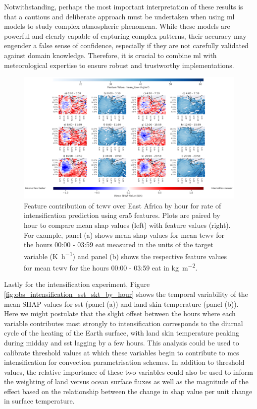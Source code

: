 Notwithstanding, perhaps the most important interpretation of these results is that a cautious and deliberate approach must be undertaken when using \acrshort{ml} models to study complex atmospheric phenomena. While these models are powerful and clearly capable of capturing complex patterns, their accuracy may engender a false sense of confidence, especially if they are not carefully validated against domain knowledge. Therefore, it is crucial to combine \acrshort{ml} with meteorological expertise to ensure robust and trustworthy implementations.

\begin{figure}[ht]
    \centering
    \includegraphics[width=\textwidth]{../figures/generated/experiments/obs_intensification/geographic_corr/obs_intensification_era5_shap_mean_tcwv_map_by_hour.png}
    \caption{Feature contribution of \acrshort{tcwv} over East Africa by hour for rate of intensification prediction using \acrshort{era5} features. Plots are paired by hour to compare mean \acrshort{shap} values (left) with feature values (right). For example, panel (a) shows mean \acrshort{shap} values for mean \acrshort{tcwv} for the hours 00:00 - 03:59 \acrshort{eat} measured in the units of the target variable (\unit{\kelvin\per\hour}) and panel (b) shows the respective feature values for mean \acrshort{tcwv} for the hours 00:00 - 03:59 \acrshort{eat} in \unit{\kilogram\per\meter\squared}.}
    \label{fig:obs_intensification_era5_shap_mean_tcwv_map_by_hour}
\end{figure}

Lastly for the intensification experiment, Figure \ref{fig:obs_intensification_sst_skt_by_hour} shows the temporal variability of the mean SHAP values for \acrfull{sst} (panel (a)) and land skin temperature (panel (b)). Here we might postulate that the slight offset between the hours where each variable contributes most strongly to intensification corresponds to the diurnal cycle of the heating of the Earth surface, with land skin temperature peaking during midday and \acrshort{sst} lagging by a few hours. This analysis could be used to calibrate threshold values at which these variables begin to contribute to \acrshort{mcs} intensification for convection parametrisation schemes. In addition to threshold values, the relative importance of these two variables could also be used to inform the weighting of land versus ocean surface fluxes as well as the magnitude of the effect based on the relationship between the change in \acrshort{shap} value per unit change in surface temperature.

